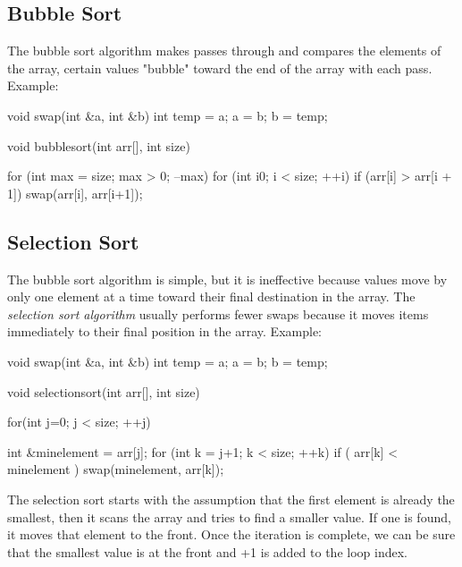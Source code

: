 \documentclass{report}
\begin{document}
    \pagebreak
    \subsection{Bubble Sort}
    \bigbreak \noindent 
    The bubble sort algorithm makes passes through and compares the elements of the array, certain values "bubble" toward the end of the array with each pass.
    \bigbreak \noindent 
    Example:
    \bigbreak \noindent 
    
    \begin{cppcode}
void swap(int &a, int &b) {
    int temp = a;
    a = b;
    b = temp;
}

void bubblesort(int arr[], int size) {

    for (int max = size; max > 0; --max) {
        for (int i{0}; i < size; ++i) {
            if (arr[i] > arr[i + 1]) {
                swap(arr[i], arr[i+1]);
            }
        }
    } 
}
    \end{cppcode}
    

    \bigbreak \noindent 
    \subsection{Selection Sort}
    \bigbreak \noindent 
    The bubble sort algorithm is simple, but it is ineffective because values move by only one element at a time toward their final destination in the array. The \textit{selection sort algorithm} usually performs fewer swaps because it moves items immediately to their final position in the array. 
    \bigbreak \noindent 
    Example:
    \bigbreak \noindent 
    
    \begin{cppcode}
void swap(int &a, int &b) {
    int temp = a;
    a = b;
    b = temp;
}

void selectionsort(int arr[], int size) {


    for(int j=0; j < size; ++j) {
        int &minelement = arr[j];
        for (int k = j+1; k < size; ++k) {
            if ( arr[k] < minelement ) {
                swap(minelement, arr[k]);
            }
        }

    }
}
    \end{cppcode}
    

    \pagebreak
    The selection sort starts with the assumption that the first element is already the smallest, then it scans the array and tries to find a smaller value. If one is found, it moves that element to the front. Once the iteration is complete, we can be sure that the smallest value is at the front and +1 is added to the loop index.
\end{document}
